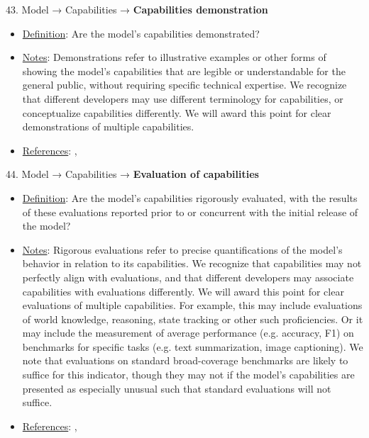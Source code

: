 43. Model → Capabilities → \textbf{Capabilities demonstration}
\vspace{-\parskip}
\begin{itemize}
	\item
	\underline{Definition}: Are the model’s capabilities demonstrated?
	\item
	\underline{Notes}: Demonstrations refer to illustrative examples or other forms of showing the model's capabilities that are legible or understandable for the general public, without requiring specific technical expertise. We recognize that different developers may use different terminology for capabilities, or conceptualize capabilities differently. We will award this point for clear demonstrations of multiple capabilities.
	\item
	\underline{References}: \citet{srivastava2022bigbench}, \citet{liang2022helm}
\end{itemize}


44. Model → Capabilities → \textbf{Evaluation of capabilities}
\vspace{-\parskip}
\begin{itemize}
	\item
	\underline{Definition}: Are the model’s capabilities rigorously evaluated, with the results of these evaluations reported prior to or concurrent with the initial release of the model?
	\item
	\underline{Notes}: Rigorous evaluations refer to precise quantifications of the model's behavior in relation to its capabilities. We recognize that capabilities may not perfectly align with evaluations, and that different developers may associate capabilities with evaluations differently. We will award this point for clear evaluations of multiple capabilities. For example, this may include evaluations of world knowledge, reasoning, state tracking or other such proficiencies. Or it may include the measurement of average performance (e.g. accuracy, F1) on benchmarks for specific tasks (e.g. text summarization, image captioning). We note that evaluations on standard broad-coverage benchmarks are likely to suffice for this indicator, though they may not if the model's capabilities are presented as especially unusual such that standard evaluations will not suffice.
	\item
	\underline{References}: \citet{srivastava2022bigbench}, \citet{liang2022helm}
\end{itemize}


